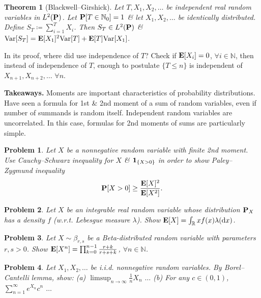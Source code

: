 \documentclass{article}
\newtheorem{problem}{Problem}
\newtheorem{theorem}{Theorem}
\begin{document}
\begin{enumerate}
\begin{itemize}
\begin{itemize}
			\begin{theorem}[Blackwell--Girshick]
				Let $T,X_1,X_2,\ldots$ be independent real random variables in $L^2({\bf P})$. Let ${\bf P}[T\in\mathbb{N}_0] = 1$ \& let $X_1,X_2,\ldots$ be identically distributed. Define $S_T\coloneqq\sum_{i=1}^T X_i$. Then $S_T\in L^2({\bf P})$ \& ${\rm Var}[S_T] = {\bf E}[X_1]^2{\rm Var}[T] + {\bf E}[T]{\rm Var}[X_1]$.
			\end{theorem}
			In its proof, where did use independence of $T$? Check if ${\bf E}[X_i] = 0$, $\forall i\in\mathbb{N}$, then instead of independence of $T$, enough to postulate $\{T\le n\}$ is independent of $X_{n+1},X_{n+2},\ldots$ $\forall n$.
			
			{\bf Takeaways.} Moments are important characteristics of probability distributions. Have seen a formula for 1st \& 2nd moment of a sum of random variables, even if number of summands is random itself. Independent random variables are uncorrelated. In this case, formulas for 2nd moments of sums are particularly simple.
			
			\begin{problem}
				Let $X$ be a nonnegative random variable with finite 2nd moment. Use Cauchy--Schwarz inequality for $X$ \& ${\bf 1}_{\{X > 0\}}$ in order to show Paley--Zygmund inequality
				\begin{equation}
					{\bf P}[X > 0]\ge\frac{{\bf E}[X]^2}{{\bf E}[X^2]}.
				\end{equation}
			\end{problem}
			
			\begin{problem}
				Let $X$ be an integrable real random variable whose distribution ${\bf P}_X$ has a density $f$ (w.r.t. Lebesgue measure $\lambda$). Show ${\bf E}[X] = \int_\mathbb{R} xf(x)\lambda({\rm d}x)$.
			\end{problem}
			
			\begin{problem}
				Let $X\sim\beta_{r,s}$ be a Beta-distributed random variable with parameters $r,s > 0$. Show ${\bf E}[X^n] = \prod_{k=0}^{n-1} \frac{r + k}{r + s + k}$, $\forall n\in\mathbb{N}$.
			\end{problem}
			
			\begin{problem}
				Let $X_1,X_2,\ldots$ be i.i.d. nonnegative random variables. By Borel--Cantelli lemma, show: (a) $\limsup_{n\to\infty} \frac{1}{n}X_n$ $\ldots$ (b) For any $c\in(0,1)$, $\sum_{n=1}^\infty e^{X_n}c^n$ $\ldots$
			\end{problem}
			

\end{itemize}
\end{itemize}
\end{enumerate}
\end{document}
